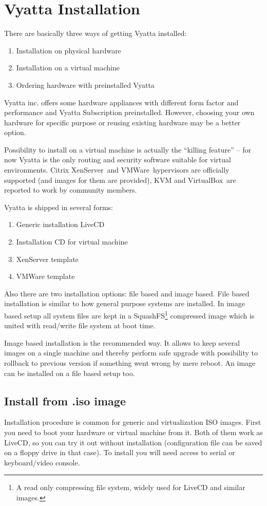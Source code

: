 \chapter{Vyatta Installation}
There are basically three ways of getting Vyatta installed:
\begin{enumerate}
 \item Installation on physical hardware
 \item Installation on a virtual machine
 \item Ordering hardware with preinstalled Vyatta
\end{enumerate}

Vyatta inc. offers some hardware appliances with different form factor and performance and Vyatta Subscription
preinstalled. However, choosing your own hardware for specific purpose or reusing existing hardware may be a better
option. 

Possibility to install on a virtual machine is actually the ``killing feature'' -- for now Vyatta is the only
routing and security software suitable for virtual environments. Citrix XenServer\texttrademark\ and 
VMWare\texttrademark\ hypervisors are officially supported (and images for them are provided), KVM and 
VirtualBox\texttrademark\ are reported to work by community members.

Vyatta is shipped in several forms:
\begin{enumerate}
 \item Generic installation LiveCD
 \item Installation CD for virtual machine
 \item XenServer template
 \item VMWare template
\end{enumerate}

Also there are two installation options: file based and image based. File based installation is similar to how 
general purpose systems are installed. In image based setup all system files are kept in a 
SquashFS\footnote{A read only compressing file system, widely used for LiveCD and similar images.} compressed image
which is united with read/write file system at boot time.

Image based installation is the recommended way. It allows to keep several images on a single machine and thereby 
perform safe upgrade with possibility to rollback to previous version if something went wrong by mere reboot. An image
can be installed on a file based setup too.

\section{Install from .iso image}
\solution
Installation procedure is common for generic and virtualization ISO images. First you need to boot your hardware or
virtual machine from it. Both of them work as LiveCD, so you can try it out without installation (configuration file
can be saved on a floppy drive in that case). To install you will need access to serial or keyboard/video console.

